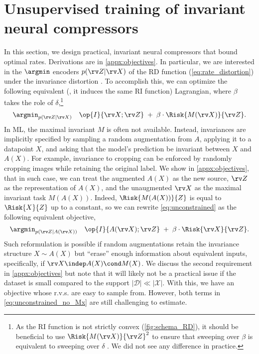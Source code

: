 \documentclass[final]{article}
\begin{document}
\section{Unsupervised training of invariant neural compressors}
\label{sec:learning}
In this section, we design practical, invariant neural compressors that bound optimal rates. 
Derivations are in \cref{appx:objectives}.
In particular, we are interested in the $\argmin$ encoders $p(\rv Z | \rv X)$ of the RD function (\cref{eq:rate_distortion}) under the invariance distortion \disttextinv{}.
To accomplish this, we can optimize the following equivalent (\ie, it induces the same RI function) Lagrangian, where $\beta$ takes the role of $\delta$,\footnote{
As the RI function is not strictly convex (\cref{fig:schema_RD}), it should be beneficial to use $\Risk{M(\rv X)}{\rv Z}^2$ to ensure that sweeping over $\beta$ is equivalent to sweeping over $\delta$ \cite{kolchinsky_caveats_2019}.
We did not see any difference in practice.
}
\begin{equation}\label{eq:unconstrained}
\argmin_{p(\rv Z| \rv X)} \quad \op{I}{\rv X; \rv Z}  \; + \; \beta  \cdot \Risk{M(\rv X)}{\rv Z}.
\end{equation}
In ML, the maximal invariant $M$ is often not available.
Instead, invariances are implicitly specified by sampling a random augmentation from $A$, applying it to a datapoint $X$, and asking that the model's prediction be invariant between $X$ and $A(X)$. 
For example, invariance to cropping can be enforced by randomly cropping images while retaining the original label. 
We show in \cref{appx:objectives}, that in such case, we can treat the augmented $A(X)$ as the new source, $\rv Z$ as the representation of $A(X)$, and the unaugmented $\rv X$ as the maximal invariant task $M(A(X))$.
Indeed, $\Risk{M(A(X))}{Z}$ is equal to $\Risk{X}{Z}$ up to a constant, so we can rewrite \cref{eq:unconstrained} as the following equivalent objective,
\begin{equation}\label{eq:unconstrained_no_Mx}
\argmin_{p(\rv Z| A(\rv X))} \quad \op{I}{A(\rv X); \rv Z}  \; + \; \beta  \cdot \Risk{\rv X}{\rv Z}.
\end{equation}
Such reformulation is possible if random augmentations retain the invariance structure $X \sim A(X)$ but ``erase'' enough information about equivalent inputs, specifically, if $\rv X \indep A(X) \cond M(X)$.
We discuss the second requirement in \cref{appx:objectives}  but note that it will likely not be a practical issue if the dataset is small compared to the support $|\mathcal{D}| \ll |\mathcal{X}|$.
With this, we have an objective whose r.v.s. are easy to sample from. 
However, both terms in \cref{eq:unconstrained_no_Mx} are still challenging to estimate. 
\end{document}
